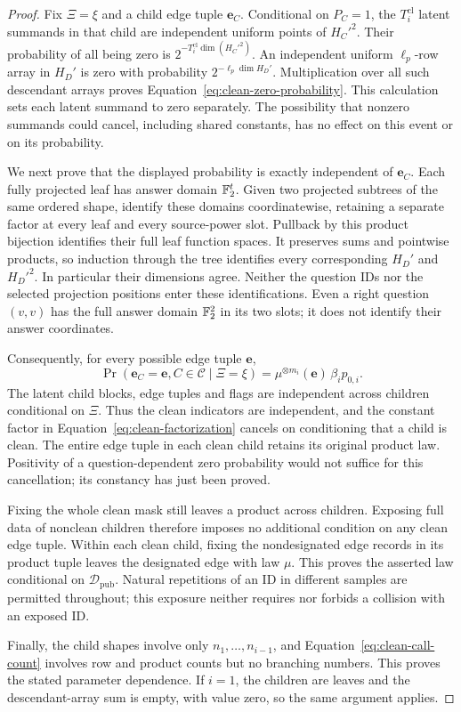 \begin{proof}
Fix $\Xi=\xi$ and a child edge tuple $\boldsymbol e_C$.  Conditional
on $P_C=1$, the $T_i^{\mathrm{cl}}$ latent summands in that child are independent
uniform points of $H_C'^2$.  Their probability of all being zero is
$2^{-T_i^{\mathrm{cl}}\dim(H_C'^2)}$.  An independent uniform
$\ell_p$-row array in $H_D'$ is zero with probability
$2^{-\ell_p\dim H_D'}$.  Multiplication over all such descendant
arrays proves Equation~\eqref{eq:clean-zero-probability}.
This calculation sets each latent summand to zero separately.
The possibility that nonzero summands could cancel, including shared
constants, has no effect on this event or on its probability.

We next prove that the displayed probability is exactly independent
of $\boldsymbol e_C$.  Each fully projected leaf has answer domain
$\mathbb F_2^t$.  Given two projected subtrees of the same ordered shape,
identify these domains coordinatewise, retaining a separate factor
at every leaf and every source-power slot.  Pullback by this product
bijection identifies their full leaf function spaces.  It preserves
sums and pointwise products, so induction through the tree identifies
every corresponding $H_D'$ and $H_D'^2$.  In particular their
dimensions agree.  Neither the question IDs nor the selected
projection positions enter these identifications.  Even a right
question $(v,v)$ has the full answer domain $\mathbb F_2^2$ in its two slots;
it does not identify their answer coordinates.

Consequently, for every possible edge tuple $\boldsymbol e$,
\begin{equation}
 \Pr(\boldsymbol e_C=\boldsymbol e, C\in\mathcal C\mid\Xi=\xi)
 =\mu^{\otimes m_i}(\boldsymbol e)\,\beta_i p_{0,i}.
 \label{eq:clean-factorization}
\end{equation}
The latent child blocks, edge tuples and flags are independent
across children conditional on $\Xi$.  Thus the clean indicators are
independent, and the constant factor in
Equation~\eqref{eq:clean-factorization} cancels on conditioning that
a child is clean.  The entire edge tuple in each clean child retains
its original product law.  Positivity of a question-dependent zero
probability would not suffice for this cancellation; its constancy
has just been proved.

Fixing the whole clean mask still leaves a product across children.
Exposing full data of nonclean children therefore imposes no
additional condition on any clean edge tuple.  Within each clean
child, fixing the nondesignated edge records in its product tuple
leaves the designated edge with law $\mu$.  This proves the asserted
law conditional on $\mathcal D_{\mathrm{pub}}$.  Natural repetitions of an ID in
different samples are permitted throughout; this exposure neither
requires nor forbids a collision with an exposed ID.

Finally, the child shapes involve only $n_1,\ldots,n_{i-1}$, and
Equation~\eqref{eq:clean-call-count} involves row and product counts
but no branching numbers.  This proves the stated parameter
dependence.  If $i=1$, the children are leaves and the descendant-array
sum is empty, with value zero, so the same argument applies.
\end{proof}

